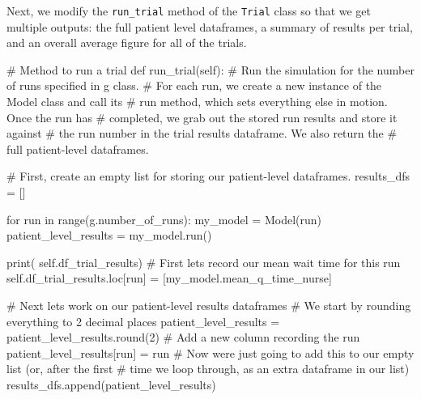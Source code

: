 \documentclass[
  letterpaper,
  DIV=11,
  numbers=noendperiod]{scrreprt}
\newenvironment{Shaded}{}{}
\newcommand{\BuiltInTok}[1]{\textcolor[rgb]{0.84,0.23,0.29}{#1}}
\newcommand{\CommentTok}[1]{\textcolor[rgb]{0.42,0.45,0.49}{#1}}
\newcommand{\ControlFlowTok}[1]{\textcolor[rgb]{0.84,0.23,0.29}{#1}}
\newcommand{\DecValTok}[1]{\textcolor[rgb]{0.00,0.36,0.77}{#1}}
\newcommand{\KeywordTok}[1]{\textcolor[rgb]{0.84,0.23,0.29}{#1}}
\newcommand{\NormalTok}[1]{\textcolor[rgb]{0.14,0.16,0.18}{#1}}
\newcommand{\OperatorTok}[1]{\textcolor[rgb]{0.14,0.16,0.18}{#1}}
\newcommand{\StringTok}[1]{\textcolor[rgb]{0.01,0.18,0.38}{#1}}
\newcommand{\VariableTok}[1]{\textcolor[rgb]{0.89,0.38,0.04}{#1}}
\begin{document}
Next, we modify the \texttt{run\_trial} method of the \texttt{Trial}
class so that we get multiple outputs: the full patient level
dataframes, a summary of results per trial, and an overall average
figure for all of the trials.

\label{edited_results_method}
\begin{Shaded}
\begin{Highlighting}[]
\CommentTok{\# Method to run a trial}
\KeywordTok{def}\NormalTok{ run\_trial(}\VariableTok{self}\NormalTok{):}
    \CommentTok{\# Run the simulation for the number of runs specified in g class.}
    \CommentTok{\# For each run, we create a new instance of the Model class and call its}
    \CommentTok{\# run method, which sets everything else in motion.  Once the run has}
    \CommentTok{\# completed, we grab out the stored run results and store it against}
    \CommentTok{\# the run number in the trial results dataframe. We also return the}
    \CommentTok{\# full patient{-}level dataframes.}

    \CommentTok{\# First, create an empty list for storing our patient{-}level dataframes.}
\NormalTok{    results\_dfs }\OperatorTok{=}\NormalTok{ []}

    \ControlFlowTok{for}\NormalTok{ run }\KeywordTok{in} \BuiltInTok{range}\NormalTok{(g.number\_of\_runs):}
\NormalTok{        my\_model }\OperatorTok{=}\NormalTok{ Model(run)}
\NormalTok{        patient\_level\_results }\OperatorTok{=}\NormalTok{ my\_model.run()}

        \BuiltInTok{print}\NormalTok{( }\VariableTok{self}\NormalTok{.df\_trial\_results)}
        \CommentTok{\# First let\textquotesingle{}s record our mean wait time for this run}
        \VariableTok{self}\NormalTok{.df\_trial\_results.loc[run] }\OperatorTok{=}\NormalTok{ [my\_model.mean\_q\_time\_nurse]}

        \CommentTok{\# Next let\textquotesingle{}s work on our patient{-}level results dataframes}
        \CommentTok{\# We start by rounding everything to 2 decimal places}
\NormalTok{        patient\_level\_results }\OperatorTok{=}\NormalTok{ patient\_level\_results.}\BuiltInTok{round}\NormalTok{(}\DecValTok{2}\NormalTok{)}
        \CommentTok{\# Add a new column recording the run}
\NormalTok{        patient\_level\_results[}\StringTok{\textquotesingle{}run\textquotesingle{}}\NormalTok{] }\OperatorTok{=}\NormalTok{ run}
        \CommentTok{\# Now we\textquotesingle{}re just going to add this to our empty list (or, after the first}
        \CommentTok{\# time we loop through, as an extra dataframe in our list)}
\NormalTok{        results\_dfs.append(patient\_level\_results)}


\end{Highlighting}
\end{Shaded}
\end{document}
